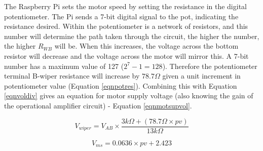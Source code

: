 \documentclass[twoside,a4]{report}
\def\br{\newline \newline \noindent}
\begin{document}
	\noindent
	The Raspberry Pi sets the motor speed by setting the resistance in the digital potentiometer. The Pi sends a 7-bit digital signal to the pot, indicating the resistance desired. Within the potentiometer is a network of resistors, and this number will determine the path taken through the circuit, the higher the number, the higher \(R_{WB}\) will be. When this increases, the voltage across the bottom resistor will decrease and the voltage across the motor will mirror this.\br
	A 7-bit number has a maximum value of 127 ($2^7 - 1 = 128$). Therefore the potentiometer terminal B-wiper resistance will increase by $78.7 \Omega$ given a unit increment in potentiometer value (Equation \ref{eqnpotres}). Combining this with Equation \ref{eqnvoldiv} gives an equation for motor supply voltage (also knowing the gain of the operational amplifier circuit) - Equation \ref{eqnmotsupvol}.
	
	\begin{equation}
	V_{wiper} = V_{AB}\times \frac{3k\Omega + \left(78.7\Omega \times pv\right)}{13k\Omega}
	\label{eqnpotres}
	\end{equation}
	
	
	\begin{equation}
	V_{ms} = 0.0636 \times pv + 2.423
	\label{eqnmotsupvol}
	\end{equation}
	

\end{document}
